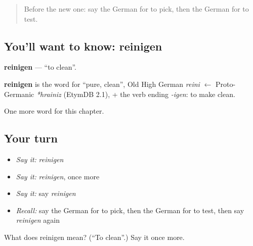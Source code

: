 \begin{quote}
Before the new one: say the German for to pick, then the German for to test.
\end{quote}

\subsection*{You'll want to know: reinigen}
\textbf{reinigen} — \textquotedblleft{}to clean\textquotedblright{}.

\begin{cousinweb}
\textbf{reinigen} is the word for \textquotedblleft{}pure, clean\textquotedblright{}, Old High German \emph{reini} $\leftarrow$ Proto-Germanic \emph{*hrainiz} (EtymDB 2.1), + the verb ending \emph{-igen}: to make clean.
\end{cousinweb}

\begin{grammarlens}[title={What you've built}]
One more word for this chapter.
\end{grammarlens}

\subsection*{Your turn}
\begin{itemize}
\raggedright
  \item \emph{Say it:} \emph{reinigen}
  \item \emph{Say it:} \emph{reinigen}, once more
  \item \emph{Say it:} say \emph{reinigen}
  \item \emph{Recall:} say the German for to pick, then the German for to test, then say \emph{reinigen} again
\end{itemize}

\begin{tcolorbox}[breakable,colback=teal!4,colframe=teal!35!black,title={Before you move on}]
What does reinigen mean? (\textquotedblleft{}To clean\textquotedblright{}.) Say it once more.
\end{tcolorbox}

